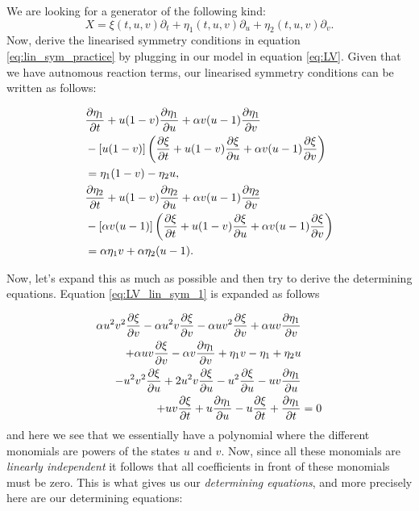 We are looking for a generator of the following kind:
\begin{equation}
X=\xi(t,u,v)\partial_t+\eta_1(t,u,v)\partial_u+\eta_2(t,u,v)\partial_v.
\end{equation}
Now, derive the linearised symmetry conditions in equation \eqref{eq:lin_sym_practice} by plugging in our model in equation \eqref{eq:LV}. Given that we have autnomous reaction terms, our linearised symmetry conditions can be written as follows:


\begin{align}
    &\pdv{\eta_1}{t}+u(1-v)\pdv{\eta_1}{u}+\alpha v(u-1)\pdv{\eta_1}{v}\nonumber\\
    &-\left[u(1-v)\right]\left(\pdv{\xi}{t}+u(1-v)\pdv{\xi}{u}+\alpha v(u-1)\pdv{\xi}{v}\right)\label{eq:LV_lin_sym_1}\\
    &=\eta_1(1-v)-\eta_2 u,\nonumber\\
    &\pdv{\eta_2}{t}+u(1-v)\pdv{\eta_2}{u}+\alpha v(u-1)\pdv{\eta_2}{v}\nonumber\\
    &-\left[\alpha v(u-1)\right]\left(\pdv{\xi}{t}+u(1-v)\pdv{\xi}{u}+\alpha v(u-1)\pdv{\xi}{v}\right)\label{eq:LV_lin_sym_2}\\
    &=\alpha\eta_1 v+\alpha\eta_2(u-1).\nonumber
\end{align}




Now, let's expand this as much as possible and then try to derive the determining equations. Equation \eqref{eq:LV_lin_sym_1} is expanded as follows



\begin{align}
  \alpha u^{2} v^{2} \pdv{\xi}{v}  - \alpha u^{2} v \pdv{\xi}{v} - \alpha u v^{2} \pdv{\xi}{v} + \alpha u v \pdv{\eta_1}{v}&\nonumber\\
  + \alpha u v \pdv{\xi}{v}  - \alpha v \pdv{\eta_1}{v}  + \eta_1 v - \eta_1 + \eta_2 u &\nonumber\\
  - u^{2} v^{2} \pdv{\xi}{u}  + 2 u^{2} v \pdv{\xi}{u}  - u^{2} \pdv{\xi}{u}  - u v \pdv{\eta_1}{u}&\label{eq:LV_lin_sym_1_expanded}\\
  + u v \pdv{\xi}{t}+ u \pdv{\eta_1}{u}  - u \pdv{\xi}{t}+ \pdv{\eta_1}{t}&=0\nonumber
\end{align}
and here we see that we essentially have a polynomial where the different monomials are powers of the states $u$ and $v$. Now, since all these monomials are \textit{linearly independent} it follows that all coefficients in front of these monomials must be zero. This is what gives us our \textit{determining equations}, and more precisely here are our determining equations:



